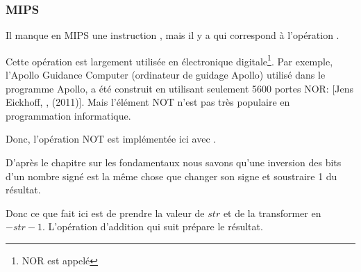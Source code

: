 ﻿\subsubsection{MIPS}




Il manque en MIPS une instruction \NOT, mais il y a \NOR qui correspond à l'opération
.

Cette opération est largement utilisée en électronique digitale\footnote{NOR est
appelé }.
Par exemple, l'Apollo Guidance Computer (ordinateur de guidage Apollo) utilisé dans
le programme Apollo, a été construit en utilisant seulement 5600 portes NOR:
[Jens Eickhoff, , (2011)].
Mais l'élément NOT n'est pas très populaire en programmation informatique.

Donc, l'opération NOT est implémentée ici avec .

D'après le chapitre sur les fondamentaux  nous savons qu'une
inversion des bits d'un nombre signé est la même chose que changer son signe et soustraire
1 du résultat.

Donc ce que \NOT fait ici est de prendre la valeur de $str$ et de la transformer
en $-str-1$.
L'opération d'addition qui suit prépare le résultat.
